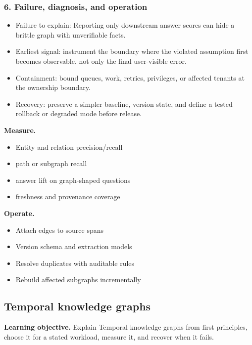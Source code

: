 \subsubsection*{6. Failure, diagnosis, and operation}
\begin{itemize}
\item Failure to explain: Reporting only downstream answer scores can hide a brittle graph with unverifiable facts.
\item Earliest signal: instrument the boundary where the violated assumption first becomes observable, not only the final user-visible error.
\item Containment: bound queues, work, retries, privileges, or affected tenants at the ownership boundary.
\item Recovery: preserve a simpler baseline, version state, and define a tested rollback or degraded mode before release.
\end{itemize}
\textbf{Measure.}\begin{itemize}
\item Entity and relation precision/recall
\item path or subgraph recall
\item answer lift on graph-shaped questions
\item freshness and provenance coverage
\end{itemize}
\textbf{Operate.}\begin{itemize}
\item Attach edges to source spans
\item Version schema and extraction models
\item Resolve duplicates with auditable rules
\item Rebuild affected subgraphs incrementally
\end{itemize}
\subsection{Temporal knowledge graphs}
\textbf{Learning objective.} Explain Temporal knowledge graphs from first principles, choose it for a stated workload, measure it, and recover when it fails.
